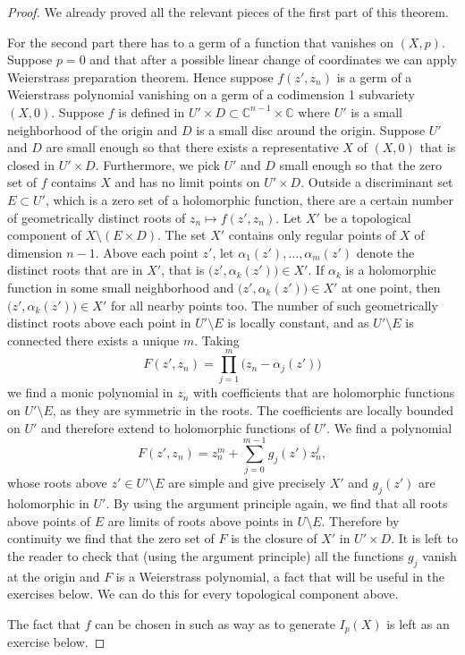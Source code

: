 \documentclass[12pt,openany]{book}
\newcommand{\C}{{\mathbb{C}}}
\theoremstyle{plain}
\theoremstyle{remark}
\theoremstyle{definition}
\theoremstyle{exercise}
\theoremstyle{example}
\begin{document}
\begin{proof}
We already proved all the relevant pieces of the first part of this
theorem.  %

For the second part there has to a germ of a function that vanishes on
$(X,p)$.  Suppose $p=0$ and that after a possible linear
change of coordinates we can apply Weierstrass preparation theorem.  Hence
suppose $f(z',z_n)$ is a germ of a Weierstrass
polynomial vanishing on a germ of a codimension 1 subvariety $(X,0)$.
Suppose $f$ is defined in $U' \times D \subset \C^{n-1} \times \C$ where $U'$ is a small neighborhood
of the origin and $D$ is a small disc around the origin.
Suppose $U'$ and $D$ are small enough so that there exists a 
representative $X$ of $(X,0)$ that is closed in $U' \times D$.
Furthermore, we pick $U'$ and $D$ small enough so that the zero set of $f$
contains $X$ and has no limit points on $U' \times D$.
Outside a discriminant set $E \subset U'$, which is a zero set of a
holomorphic function, there are a certain number of geometrically
distinct roots of $z_n \mapsto f(z',z_n)$.  Let $X'$ be a topological component of $X \setminus ( E
\times D )$.  The set $X'$ contains only regular points of $X$ of
dimension $n-1$.
Above each point $z'$, let 
$\alpha_1(z'),\ldots,\alpha_m(z')$ denote the distinct roots that are in $X'$,
that is $\bigl(z',\alpha_k(z')\bigr) \in X'$.
If $\alpha_k$ is a holomorphic function in some small neighborhood and
$\bigl(z',\alpha_k(z')\bigr) \in X'$ at one point, then 
$\bigl(z',\alpha_k(z')\bigr) \in X'$ for all nearby points too.
The number of
such geometrically distinct roots above each point in
$U' \setminus E$ is locally constant, and as $U' \setminus E$ is connected
there exists a unique $m$.  Taking
\begin{equation*}
F(z',z_n) = \prod_{j=1}^m \bigl( z_n-\alpha_j(z')\bigr)
\end{equation*}
we find a monic polynomial in $z_n$ with coefficients that are holomorphic
functions on $U' \setminus E$, as they are symmetric in the roots.
The coefficients are locally bounded
on $U'$ and therefore extend to holomorphic functions of $U'$.  We find
a polynomial
\begin{equation*}
F(z',z_n) = z_n^m + \sum_{j=0}^{m-1} g_j(z') z_n^j ,
\end{equation*}
whose roots
above $z' \in U' \setminus E$
are simple and give precisely $X'$
and $g_j(z')$ are holomorphic in $U'$. 
  By using the argument principle
again, we find that all roots above points of $E$ are limits of roots
above points in $U \setminus E$.
Therefore by continuity we find that
the zero set of $F$ is the closure of $X'$ in $U' \times D$.
It is left to the reader to check that (using the argument principle)
all the functions $g_j$ vanish at the origin and $F$ is a Weierstrass
polynomial, a fact that will be useful in the exercises below.
We can do this for every topological component above.

The fact that $f$ can be chosen in such as way as to generate $I_p(X)$
is left as an exercise below.
\end{proof}
\end{document}
